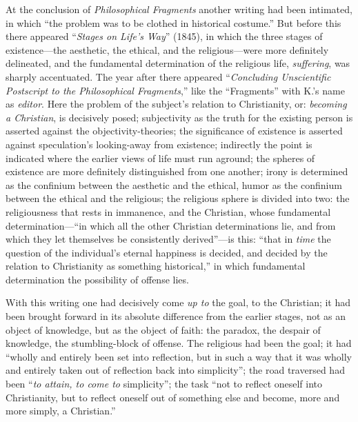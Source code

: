 \documentclass[12pt,a4paper]{article}
\newcommand{\opage}[1]{\marginnote{\footnotesize\textit{[#1]}}}
\begin{document}
At the conclusion of \emph{Philosophical Fragments} another writing had been intimated,
in which ``the problem was to be clothed in historical costume.'' But before this
there appeared ``\emph{Stages on Life's Way}'' (1845), in which the three stages of
existence---the aesthetic, the ethical, and the religious---were more definitely
delineated, and the fundamental determination of the religious life, \emph{suffering},
was sharply accentuated. The year after there appeared ``\emph{Concluding Unscientific
Postscript to the Philosophical Fragments},'' like the ``Fragments'' with K.'s name
as \emph{editor}. Here the problem of the subject's relation to Christianity, or:
\emph{becoming a Christian}, is decisively posed; subjectivity as the truth for the
existing person is asserted against the objectivity-theories; the significance of
existence is asserted against speculation's looking-away from existence; indirectly
the point is indicated where the earlier views of life must run aground; the
spheres of existence are more definitely distinguished from one another; irony is
determined as the confinium between the aesthetic and the ethical, humor as
the confinium between the ethical and the religious; the religious sphere is
divided into two: the religiousness that rests in immanence, and the Christian,
whose fundamental determination---``in which all the other Christian determinations
lie, and from which they let themselves be consistently derived''---is this: ``that
in \emph{time} the question of the individual's eternal happiness is decided, and decided
by the relation to Christianity as something historical,'' in which fundamental
determination the possibility of offense lies.

With this writing one had decisively come \emph{up to} the goal, to the Christian; it had
been brought forward in its absolute difference from the earlier stages, not as an
object of knowledge, but as the object of faith: the paradox, the despair of
knowledge, the stumbling-block of offense. The \opage{1180}religious had been the goal; it had
``wholly and entirely been set into reflection, but in such a way that it was
wholly and entirely taken out of reflection back into simplicity''; the road
traversed had been ``\emph{to attain, to come to} simplicity''; the task ``not to reflect
oneself into Christianity, but to reflect oneself out of something else and become,
more and more simply, a Christian.''
\end{document}
